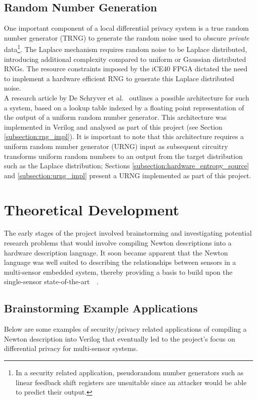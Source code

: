 \documentclass[12pt]{article}
\begin{document}
  \subsection{Random Number Generation} \label{subsection:intro_rng}
    One important component of a local differential privacy system is a true random number generator (TRNG) to generate the random noise used to obscure \textit{private} data\footnote{In a security related application, pseudorandom number generators such as linear feedback shift registers are unsuitable since an attacker would be able to predict their output.}. The Laplace mechanism requires random noise to be Laplace distributed, introducing additional complexity compared to uniform or Gaussian distributed RNGs. The resource constraints imposed by the iCE40 FPGA dictated the need to implement a hardware efficient RNG to generate this Laplace distributed noise.\\

    A research article by De Schryver et al.~\cite{DeSchryver} outlines a possible architecture for such a system, based on a lookup table indexed by a floating point representation of the output of a uniform random number generator. This architecture was implemented in Verilog and analysed as part of this project (see Section \ref{subsection:rng_impl}). It is important to note that this architecture requires a uniform random number generator (URNG) input as subsequent circuitry transforms uniform random numbers to an output from the target distribution such as the Laplace distribution; Sections \ref{subsection:hardware_entropy_source} and \ref{subsection:urng_impl} present a URNG implemented as part of this project.

\newpage



%
%

\section{Theoretical Development}
  The early stages of the project involved brainstorming and investigating potential research problems that would involve compiling Newton descriptions into a hardware description language. It soon became apparent that the Newton language was well suited to describing the relationships between sensors in a multi-sensor embedded system, thereby providing a basis to build upon the single-sensor state-of-the-art~\cite{Choi2018GuaranteeingLD}~\cite{diffpriv_2006}.
  \subsection{Brainstorming Example Applications}
    Below are some examples of security/privacy related applications of compiling a Newton description into Verilog that eventually led to the project's focus on differential privacy for multi-sensor systems.
\end{document}

